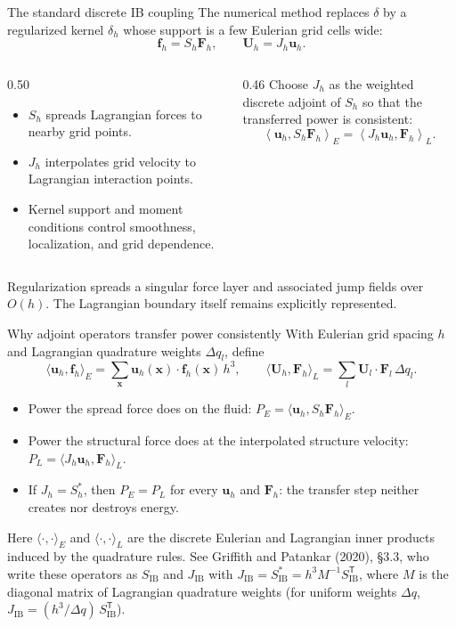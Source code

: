 \documentclass[aspectratio=169,11pt]{beamer}
\newcommand{\xvec}{\bm{x}}
\newcommand{\uvec}{\bm{u}}
\newcommand{\Fvec}{\bm{F}}
\newcommand{\fvec}{\bm{f}}
\newcommand{\Uvec}{\bm{U}}
\begin{document}
\begin{frame}{The standard discrete IB coupling}
The numerical method replaces $\delta$ by a regularized kernel $\delta_h$ whose support is a few Eulerian grid cells wide:
\[
  \fvec_h=S_h\Fvec_h,
  \qquad
  \Uvec_h=J_h\uvec_h.
\]
\begin{columns}[T,onlytextwidth]
\begin{column}{0.50\textwidth}
\begin{itemize}\itemsep3pt
  \item $S_h$ spreads Lagrangian forces to nearby grid points.
  \item $J_h$ interpolates grid velocity to Lagrangian interaction points.
  \item Kernel support and moment conditions control smoothness, localization, and grid dependence.
\end{itemize}
\end{column}
\begin{column}{0.46\textwidth}
Choose $J_h$ as the weighted discrete adjoint of $S_h$ so that the transferred power is consistent:
\[
  \left\langle \uvec_h,S_h\Fvec_h\right\rangle_E
  =
  \left\langle J_h\uvec_h,\Fvec_h\right\rangle_L.
\]
\end{column}
\end{columns}
\begin{punchbox}
\small Regularization spreads a singular force layer and associated jump fields over $O(h)$. The Lagrangian boundary itself remains explicitly represented.
\end{punchbox}
\end{frame}

\begin{frame}{Why adjoint operators transfer power consistently}
With Eulerian grid spacing $h$ and Lagrangian quadrature weights $\Delta q_l$, define
\[
  \langle\uvec_h,\fvec_h\rangle_E=\sum_{\xvec}\uvec_h(\xvec)\cdot\fvec_h(\xvec)\,h^3,
  \qquad
  \langle\Uvec_h,\Fvec_h\rangle_L=\sum_{l}\Uvec_l\cdot\Fvec_l\,\Delta q_l.
\]
\begin{itemize}\itemsep4pt
  \item Power the spread force does on the fluid: $P_E=\langle\uvec_h,S_h\Fvec_h\rangle_E$.
  \item Power the structural force does at the interpolated structure velocity: $P_L=\langle J_h\uvec_h,\Fvec_h\rangle_L$.
  \item If $J_h=S_h^{*}$, then $P_E=P_L$ for every $\uvec_h$ and $\Fvec_h$: the transfer step neither creates nor destroys energy.
\end{itemize}
{\scriptsize Here $\langle\cdot,\cdot\rangle_E$ and $\langle\cdot,\cdot\rangle_L$ are the discrete Eulerian and Lagrangian inner products induced by the quadrature rules. See Griffith and Patankar (2020), \S3.3, who write these operators as $S_{\mathrm{IB}}$ and $J_{\mathrm{IB}}$ with $J_{\mathrm{IB}}=S_{\mathrm{IB}}^{*}=h^3M^{-1}S_{\mathrm{IB}}^{\mathsf T}$, where $M$ is the diagonal matrix of Lagrangian quadrature weights (for uniform weights $\Delta q$, $J_{\mathrm{IB}}=(h^3/\Delta q)\,S_{\mathrm{IB}}^{\mathsf T}$).\par}
\end{frame}
\end{document}
